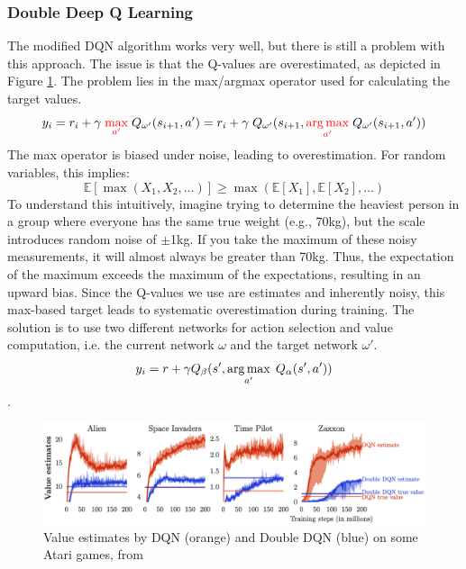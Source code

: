 \subsubsection{Double Deep Q Learning}
The modified DQN algorithm works very well, but there is still a problem with this approach.
The issue is that the Q-values are overestimated, as depicted in Figure \ref{fig:ddqn}.
The problem lies in the max/argmax operator used for calculating the target values.
$$y_i= r_i + \gamma\;{\color{red}\max\limits_{a'}}\;Q_{\omega'}(s_{i+1},a') 
=  r_i + \gamma \;Q_{\omega'}(s_{i+1},{\color{red}\operatorname*{arg\,max}\limits_{a'}}\;Q_{\omega'}(s_{i+1},a'))$$
The max operator is biased under noise, leading to overestimation. For random variables, this implies:
$$\mathbb{E}[\max{(X_1,X_2,\dots)}] \geq \max{(\mathbb{E}[X_1],\mathbb{E}[X_2],\dots)}$$
To understand this intuitively, imagine trying to determine the heaviest person in a group where everyone 
has the same true weight (e.g., 70kg), but the scale introduces random noise of $\pm$1kg. If you take the maximum
of these noisy measurements, it will almost always be greater than 70kg. Thus, the expectation of the maximum exceeds 
the maximum of the expectations, resulting in an upward bias.\newline 
Since the Q-values we use are estimates and inherently noisy, this max-based target leads to systematic overestimation during 
training. The solution is to use two different networks for action selection and value computation, i.e. the current network 
$\omega$ and the target network $\omega'$.
$$y_i = r + \gamma Q_{\beta}(s',\operatorname*{arg\,max}\limits_{a'}\; Q_{\alpha}(s',a'))$$. 
\begin{figure}[H]
    \centering
    \includegraphics[width=\linewidth]{images/DDQN.png}
    \caption{Value estimates by DQN (orange) and Double DQN (blue) on some Atari games, from \cite{vanhasselt2015deepreinforcementlearningdouble}}
    \label{fig:ddqn}
\end{figure}

